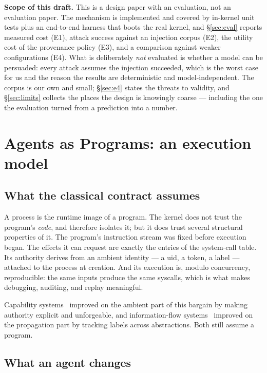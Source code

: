 \documentclass[11pt]{article}
\begin{document}
\noindent\textbf{Scope of this draft.} This is a design paper with an
evaluation, not an evaluation paper. The mechanism is implemented and covered by
in-kernel unit tests plus an end-to-end harness that boots the real kernel, and
\S\ref{sec:eval} reports measured cost (E1), attack success against an injection
corpus (E2), the utility cost of the provenance policy (E3), and a comparison
against weaker configurations (E4). What is deliberately \emph{not} evaluated is
whether a model can be persuaded: every attack assumes the injection succeeded,
which is the worst case for us and the reason the results are deterministic and
model-independent. The corpus is our own and small; \S\ref{sec:e4} states the
threats to validity, and \S\ref{sec:limits} collects the places the design is
knowingly coarse --- including the one the evaluation turned from a prediction
into a number.

\section{Agents as Programs: an execution model}
\label{sec:model}

\subsection{What the classical contract assumes}

A process is the runtime image of a program. The kernel does not trust the
program's \emph{code}, and therefore isolates it; but it does trust several
structural properties of it. The program's instruction stream was fixed before
execution began. The effects it can request are exactly the entries of the
system-call table. Its authority derives from an ambient identity --- a uid, a
token, a label --- attached to the process at creation. And its execution is,
modulo concurrency, reproducible: the same inputs produce the same syscalls,
which is what makes debugging, auditing, and replay meaningful.

Capability systems~\cite{levy1984capability,shapiro1999eros,klein2009sel4}
improved on the ambient part of this bargain by making authority explicit and
unforgeable, and information-flow
systems~\cite{efstathopoulos2005asbestos,zeldovich2006histar,krohn2007flume}
improved on the propagation part by tracking labels across abstractions. Both
still assume a program.

\subsection{What an agent changes}
\end{document}
